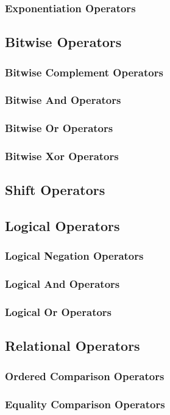 \documentclass[10pt,twoside,titlepage]{article}
\begin{document}
\subsubsection{Exponentiation Operators}
\subsection{Bitwise Operators}
\subsubsection{Bitwise Complement Operators}
\subsubsection{Bitwise And Operators}
\subsubsection{Bitwise Or Operators}
\subsubsection{Bitwise Xor Operators}
\subsection{Shift Operators}
\subsection{Logical Operators}
\subsubsection{Logical Negation Operators}
\subsubsection{Logical And Operators}
\subsubsection{Logical Or Operators}
\subsection{Relational Operators}
\subsubsection{Ordered Comparison Operators}
\subsubsection{Equality Comparison Operators}
\end{document}
